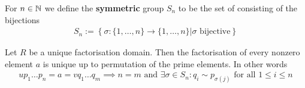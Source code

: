 \begin{definition}[]
	For $n \in \mathbb{N}$ we define the \textbf{symmetric} group $S_n$ to be the set of consisting of the bijections
	\begin{align*}
		S_n := \left\{\sigma: \{1, \ldots, n\} \to \{1, \ldots, n\} \big\vert \sigma \text{ bijective}\right\}
	\end{align*}
\end{definition}
\begin{theorem}
	Let $R$ be a unique factorisation domain. Then the factorisation of every nonzero element $a$ is unique up to permutation of the prime elements. In other words
	\begin{align*}
		up_1 \dots p_n = a = vq_1 \dots q_m \implies n = m \text{ and } \exists \sigma \in S_n: q_i \sim p_{\sigma(j)} \text{ for all } 1 \leq i \leq n
	\end{align*}
\end{theorem}
